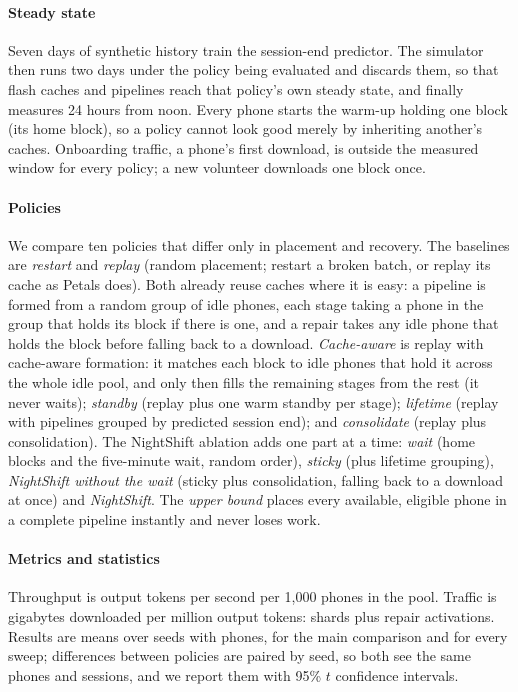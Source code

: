 \documentclass[preprint,review,12pt,authoryear]{elsarticle}
\begin{document}
\paragraph{Steady state} Seven days of synthetic history train the
session-end predictor. The simulator then runs two days under the policy being
evaluated and discards them, so that flash caches and pipelines reach that
policy's own steady state, and finally measures 24 hours from noon. Every phone
starts the warm-up holding one block (its home block), so a policy cannot look
good merely by inheriting another's caches. Onboarding traffic, a phone's first
download, is outside the measured window for every policy; a new volunteer
downloads one block once.

\paragraph{Policies} We compare ten policies that differ only in placement and
recovery. The baselines are \emph{restart} and \emph{replay} (random placement;
restart a broken batch, or replay its cache as Petals does). Both already reuse
caches where it is easy: a pipeline is formed from a random group of idle
phones, each stage taking a phone in the group that holds its block if there
is one, and a repair takes any idle phone that holds the block before falling
back to a download. \emph{Cache-aware} is replay with cache-aware formation: it
matches each block to idle phones that hold it across the whole idle pool, and
only then fills the remaining stages from the rest (it never waits);
\emph{standby} (replay plus one warm standby per stage); \emph{lifetime}
(replay with pipelines grouped by predicted session end); and
\emph{consolidate} (replay plus consolidation). The NightShift ablation adds
one part at a time: \emph{wait} (home blocks and the five-minute wait, random
order), \emph{sticky} (plus lifetime grouping), \emph{NightShift without the
wait} (sticky plus consolidation, falling back to a download at once) and
\emph{NightShift}. The \emph{upper bound} places every available, eligible
phone in a complete pipeline instantly and never loses work.

\paragraph{Metrics and statistics} Throughput is output tokens per second per
1,000 phones in the pool. Traffic is gigabytes downloaded per million output
tokens: shards plus repair activations. Results are means over \Seeds{} seeds
with \NPhones{} phones, for the main comparison and for every sweep;
differences between policies are paired by seed, so both see the same phones
and sessions, and we report them with 95\% $t$ confidence intervals.
\end{document}
